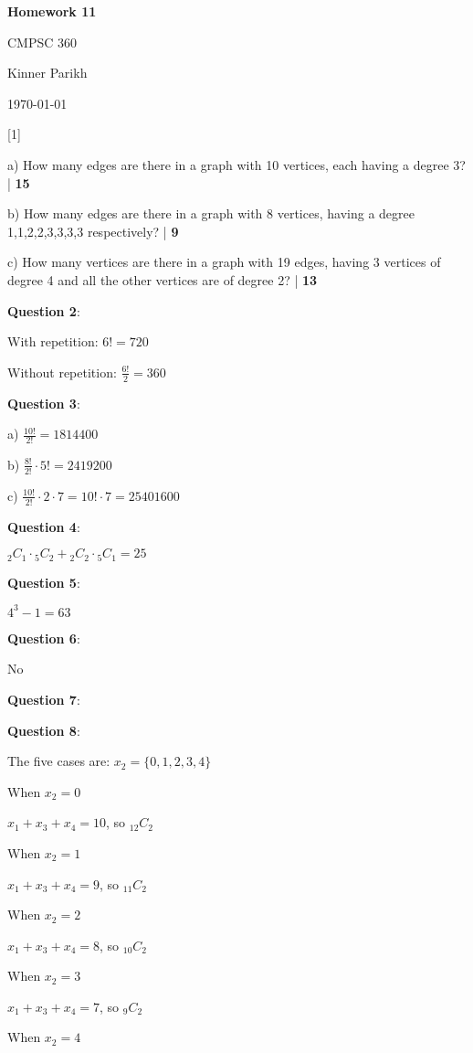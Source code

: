 \documentclass{article} %
\newcommand{\question}[2][]{\begin{flushleft}
        \textbf{Question #1}: \textit{#2}

\end{flushleft}}
\newcommand{\maketitletwo}[2][]{\begin{center}
        \Large{\textbf{Homework #1}
            
            CMPSC 360} %
        \vspace{5pt}
        
        \normalsize{Kinner Parikh  %
        
        \today}        %
        \vspace{15pt}
        
\end{center}}
\begin{document}
    \maketitletwo[11]  %
    
    \question[1]{}

    a) How many edges are there in a graph with 10 vertices, each having a degree 3? | \textbf{15}

    b) How many edges are there in a graph with 8 vertices, having a degree 1,1,2,2,3,3,3,3 
    \tabto{1cm}respectively? | \textbf{9}

    c)  How many vertices are there in a graph with 19 edges, having 3 vertices of degree 4 and all 
    \tabto{0.96cm}the other vertices are of degree 2? | \textbf{13}

    \question[2]{}

    With repetition: $6! = 720$

    Without repetition: $\frac{6!}{2} = 360$

    \question[3]{}

    a) $\frac{10!}{2!} = 1814400$

    b) $\frac{8!}{2!} \cdot 5! = 2419200$

    c) $\frac{10!}{2!} \cdot 2 \cdot 7 = 10! \cdot 7 = 25401600$

    \question[4]{}

    ${}_2 C_1 \cdot {}_5 C_2 + {}_2 C_2 \cdot {}_5 C_1 = 25$

    \question[5]{}

    $4^3 - 1 = 63$

    \question[6]{}

    No

    \question[7]{}

    \newpage

    \question[8]{}

    The five cases are: $x_2 = \{0, 1, 2, 3, 4\}$

    When $x_2 = 0$

    \tabto{1cm} $x_1 + x_3 + x_4 = 10$, so ${}_{12} C_2$

    When $x_2 = 1$

    \tabto{1cm} $x_1 + x_3 + x_4 = 9$, so ${}_{11} C_2$

    When $x_2 = 2$

    \tabto{1cm} $x_1 + x_3 + x_4 = 8$, so ${}_{10} C_2$

    When $x_2 = 3$

    \tabto{1cm} $x_1 + x_3 + x_4 = 7$, so ${}_{9} C_2$

    When $x_2 = 4$
\end{document}
